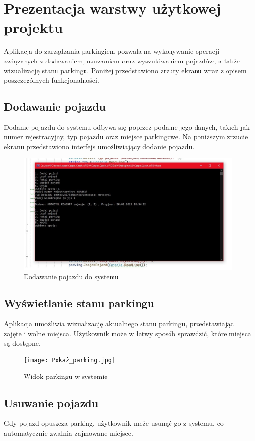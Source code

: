 ﻿%
\chapter{Prezentacja warstwy użytkowej projektu}

Aplikacja do zarządzania parkingiem pozwala na wykonywanie operacji związanych z dodawaniem, usuwaniem oraz wyszukiwaniem pojazdów, a także wizualizację stanu parkingu. Poniżej przedstawiono zrzuty ekranu wraz z opisem poszczególnych funkcjonalności.

\section{Dodawanie pojazdu}
Dodanie pojazdu do systemu odbywa się poprzez podanie jego danych, takich jak numer rejestracyjny, typ pojazdu oraz miejsce parkingowe. Na poniższym zrzucie ekranu przedstawiono interfejs umożliwiający dodanie pojazdu.
\begin{figure}[H]
    \centering
    \includegraphics[width=0.8\linewidth]{Dodaj_pojazd.jpg}
    \caption{Dodawanie pojazdu do systemu}
    \label{fig:enter-label}
\end{figure}

\section{Wyświetlanie stanu parkingu}
Aplikacja umożliwia wizualizację aktualnego stanu parkingu, przedstawiając zajęte i wolne miejsca. Użytkownik może w łatwy sposób sprawdzić, które miejsca są dostępne.


\begin{figure}[H]
    \centering
    \texttt{[image: Pokaż\_parking.jpg]}
    \caption{Widok parkingu w systemie}
    \label{fig:enter-label}
\end{figure}
\section{Usuwanie pojazdu}
Gdy pojazd opuszcza parking, użytkownik może usunąć go z systemu, co automatycznie zwalnia zajmowane miejsce.

